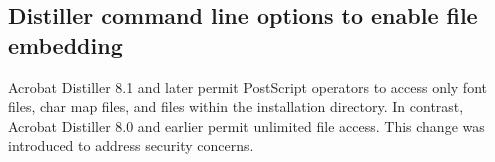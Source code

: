 \documentclass[letterpaper,12pt,english,openany,oneside]{sphinxmanual}
\begin{document}
\begin{sphinxVerbatim}[commandchars=\\\{\}]
 \PYG{p}{[}  
    \PYG{p}{[}      
    \PYG{p}{[}         
    \PYG{p}{[}         
    \PYG{p}{[}  
  
        

         
             
             
                
         
    \PYG{p}{[}     
    \PYG{p}{[}  
\end{sphinxVerbatim}


\subsection{Distiller command line options to enable file embedding}
\label{\detokenize{pdfmark_Basic:distiller-command-line-options-to-enable-file-embedding}}
Acrobat Distiller 8.1 and later permit PostScript operators to access only font files, char map files, and files within the installation directory. In contrast, Acrobat Distiller 8.0 and earlier permit unlimited file access. This change was introduced to address security concerns.
\end{document}
